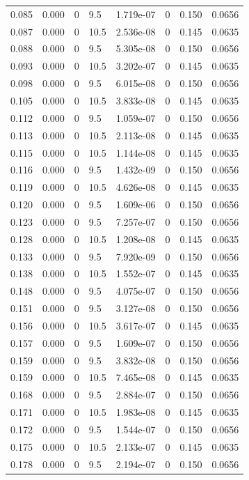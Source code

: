 \documentclass[preview]{standalone}
\begin{document}
{{\begin{tabular}{L{1.2cm}C{1.2cm} C{0.3cm}C{0.5cm} C{1.4cm}C{1.4cm} C{1.4cm}C{1.4cm}}
  0.085  &  0.000  & 0     & 9.5 &  1.719e-07  & 0  & 0.150 &  0.0656   \\ 
  0.087  &  0.000  & 0     & 10.5 &  2.536e-08  & 0  & 0.145 &  0.0635   \\ 
  0.088  &  0.000  & 0     & 9.5 &  5.305e-08  & 0  & 0.150 &  0.0656   \\ 
  0.093  &  0.000  & 0     & 10.5 &  3.202e-07  & 0  & 0.145 &  0.0635   \\ 
  0.098  &  0.000  & 0     & 9.5 &  6.015e-08  & 0  & 0.150 &  0.0656   \\ 
  0.105  &  0.000  & 0     & 10.5 &  3.833e-08  & 0  & 0.145 &  0.0635   \\ 
  0.112  &  0.000  & 0     & 9.5 &  1.059e-07  & 0  & 0.150 &  0.0656   \\ 
  0.113  &  0.000  & 0     & 10.5 &  2.113e-08  & 0  & 0.145 &  0.0635   \\ 
  0.115  &  0.000  & 0     & 10.5 &  1.144e-08  & 0  & 0.145 &  0.0635   \\ 
  0.116  &  0.000  & 0     & 9.5 &  1.432e-09  & 0  & 0.150 &  0.0656   \\ 
  0.119  &  0.000  & 0     & 10.5 &  4.626e-08  & 0  & 0.145 &  0.0635   \\ 
  0.120  &  0.000  & 0     & 9.5 &  1.609e-06  & 0  & 0.150 &  0.0656   \\ 
  0.123  &  0.000  & 0     & 9.5 &  7.257e-07  & 0  & 0.150 &  0.0656   \\ 
  0.128  &  0.000  & 0     & 10.5 &  1.208e-08  & 0  & 0.145 &  0.0635   \\ 
  0.133  &  0.000  & 0     & 9.5 &  7.920e-09  & 0  & 0.150 &  0.0656   \\ 
  0.138  &  0.000  & 0     & 10.5 &  1.552e-07  & 0  & 0.145 &  0.0635   \\ 
  0.148  &  0.000  & 0     & 9.5 &  4.075e-07  & 0  & 0.150 &  0.0656   \\ 
  0.151  &  0.000  & 0     & 9.5 &  3.127e-08  & 0  & 0.150 &  0.0656   \\ 
  0.156  &  0.000  & 0     & 10.5 &  3.617e-07  & 0  & 0.145 &  0.0635   \\ 
  0.157  &  0.000  & 0     & 9.5 &  1.609e-07  & 0  & 0.150 &  0.0656   \\ 
  0.159  &  0.000  & 0     & 9.5 &  3.832e-08  & 0  & 0.150 &  0.0656   \\ 
  0.159  &  0.000  & 0     & 10.5 &  7.465e-08  & 0  & 0.145 &  0.0635   \\ 
  0.168  &  0.000  & 0     & 9.5 &  2.884e-07  & 0  & 0.150 &  0.0656   \\ 
  0.171  &  0.000  & 0     & 10.5 &  1.983e-08  & 0  & 0.145 &  0.0635   \\ 
  0.172  &  0.000  & 0     & 9.5 &  1.544e-07  & 0  & 0.150 &  0.0656   \\ 
  0.175  &  0.000  & 0     & 10.5 &  2.133e-07  & 0  & 0.145 &  0.0635   \\ 
  0.178  &  0.000  & 0     & 9.5 &  2.194e-07  & 0  & 0.150 &  0.0656   \\ 
\hline 
\end{tabular} 

}}
\end{document}
